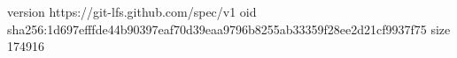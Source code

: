 version https://git-lfs.github.com/spec/v1
oid sha256:1d697efffde44b90397eaf70d39eaa9796b8255ab33359f28ee2d21cf9937f75
size 174916

